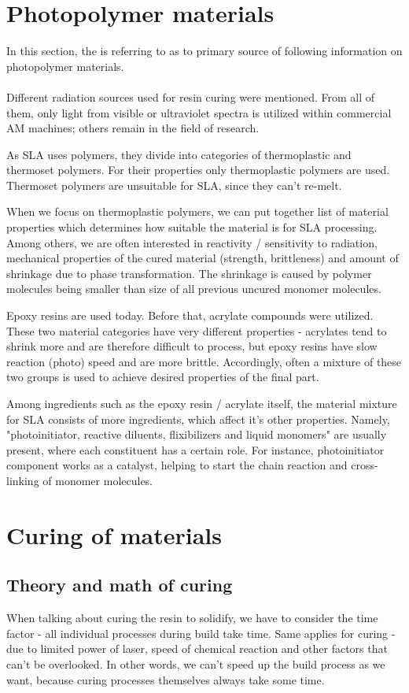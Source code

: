 \documentclass[a4paper, twoside, 11pt]{report}
\begin{document}
\section{Photopolymer materials}
In this section, the \cite{AMT} is referring to \cite{SLAmaterials} as to primary source of following information on photopolymer materials.\\
\\
Different radiation sources used for resin curing were mentioned. From all of them, only light from visible or ultraviolet spectra is utilized within commercial AM machines; others remain in the field of research.

	As SLA uses polymers, they divide into categories of thermoplastic and thermoset polymers. For their properties only thermoplastic polymers are used. Thermoset polymers are unsuitable for SLA, since they can't re-melt.
	
	When we focus on thermoplastic polymers, we can put together list of material properties which determines how suitable the material is for SLA processing. Among others, we are often interested in reactivity / sensitivity to radiation, mechanical properties of the cured material (strength, brittleness) and amount of shrinkage due to phase transformation. The shrinkage is caused  by polymer molecules being smaller than  size of all previous uncured monomer molecules.
	
	Epoxy resins are used today. Before that, acrylate compounds were utilized. These two material categories have very different properties - acrylates tend to shrink more and are therefore difficult to process, but epoxy resins have slow reaction (photo) speed and are more brittle. Accordingly, often a mixture of these two groups is used to achieve desired properties of the final part.
	
	Among ingredients such as the epoxy resin / acrylate itself, the material mixture for SLA consists of more ingredients, which affect it's other properties. Namely, "photoinitiator, reactive diluents, flixibilizers and liquid monomers" \cite[p. ~67]{AMT} are usually present, where each constituent has a certain role. For instance, photoinitiator component works as a catalyst, helping to start the chain reaction and cross-linking of monomer molecules.
%
%
%
\section{Curing of materials}
%
\subsection{Theory and math of curing}
When talking about curing the resin to solidify, we have to consider the time factor - all individual processes during build take time. Same applies for curing - due to limited power of laser, speed of chemical reaction and other factors that can't be overlooked. In other words, we can't speed up the build process as we want, because curing processes themselves always take some time.
\end{document}
